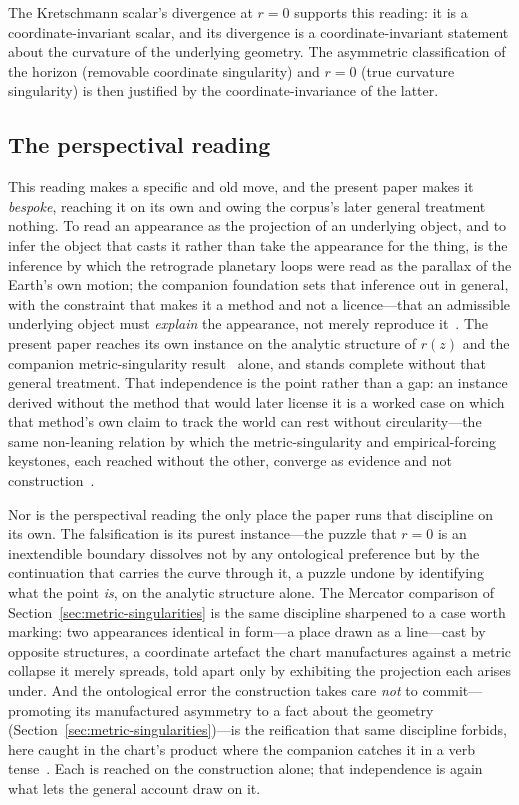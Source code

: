 \documentclass[11pt,a4paper]{article}
\theoremstyle{definition}
\begin{document}
The Kretschmann scalar's divergence at $r = 0$ supports this reading: it is a coordinate-invariant scalar, and its divergence is a coordinate-invariant statement about the curvature of the underlying geometry. The asymmetric classification of the horizon (removable coordinate singularity) and $r = 0$ (true curvature singularity) is then justified by the coordinate-invariance of the latter.

\subsection{The perspectival reading}

This reading makes a specific and old move, and the present paper makes it \emph{bespoke}, reaching it on its own and owing the corpus's later general treatment nothing. To read an appearance as the projection of an underlying object, and to infer the object that casts it rather than take the appearance for the thing, is the inference by which the retrograde planetary loops were read as the parallax of the Earth's own motion; the companion foundation sets that inference out in general, with the constraint that makes it a method and not a licence---that an admissible underlying object must \emph{explain} the appearance, not merely reproduce it~\cite{JanzenShadowExistence}. The present paper reaches its own instance on the analytic structure of $r(z)$ and the companion metric-singularity result~\cite{JanzenBHcausality} alone, and stands complete without that general treatment. That independence is the point rather than a gap: an instance derived without the method that would later license it is a worked case on which that method's own claim to track the world can rest without circularity---the same non-leaning relation by which the metric-singularity and empirical-forcing keystones, each reached without the other, converge as evidence and not construction~\cite{JanzenBHcausality,JanzenModernParallax}.

Nor is the perspectival reading the only place the paper runs that discipline on its own. The falsification is its purest instance---the puzzle that $r=0$ is an inextendible boundary dissolves not by any ontological preference but by the continuation that carries the curve through it, a puzzle undone by identifying what the point \emph{is}, on the analytic structure alone. The Mercator comparison of Section~\ref{sec:metric-singularities} is the same discipline sharpened to a case worth marking: two appearances identical in form---a place drawn as a line---cast by opposite structures, a coordinate artefact the chart manufactures against a metric collapse it merely spreads, told apart only by exhibiting the projection each arises under. And the ontological error the construction takes care \emph{not} to commit---promoting its manufactured asymmetry to a fact about the geometry (Section~\ref{sec:metric-singularities})---is the reification that same discipline forbids, here caught in the chart's product where the companion catches it in a verb tense~\cite{JanzenBHcausality}. Each is reached on the construction alone; that independence is again what lets the general account draw on it.
\end{document}

